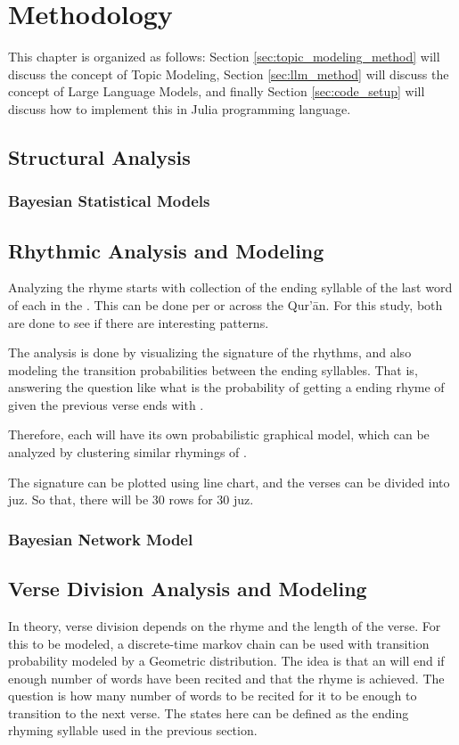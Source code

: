 
\chapter{Methodology}
This chapter is organized as follows: Section \ref{sec:topic_modeling_method} will discuss the concept of Topic Modeling, Section \ref{sec:llm_method} will discuss the concept of Large Language Models, and finally Section \ref{sec:code_setup} will discuss how to implement this in Julia programming language.
\section{Structural Analysis}
\subsection{Bayesian Statistical Models}

\section{Rhythmic Analysis and Modeling}
Analyzing the rhyme starts with collection of the ending syllable of the last word of each   in the  . This can be done per   or across the Qur'\=an. For this study, both are done to see if there are interesting patterns. 

The analysis is done by visualizing the signature of the rhythms, and also modeling the transition probabilities between the ending syllables. That is, answering the question like what is the probability of getting a ending rhyme of   given the previous verse ends with  .

Therefore, each   will have its own probabilistic graphical model, which can be analyzed by clustering similar rhymings of  .

The signature can be plotted using line chart, and the verses can be divided into juz. So that, there will be 30 rows for 30 juz.
\subsection{Bayesian Network Model}
\section{Verse Division Analysis and Modeling}
In theory, verse division depends on the rhyme and the length of the verse. For this to be modeled, a discrete-time markov chain can be used with transition probability modeled by a Geometric distribution. The idea is that an   will end if enough number of words have been recited and that the rhyme is achieved. The question is how many number of words to be recited for it to be enough to transition to the next verse. The states here can be defined as the ending rhyming syllable used in the previous section. 
